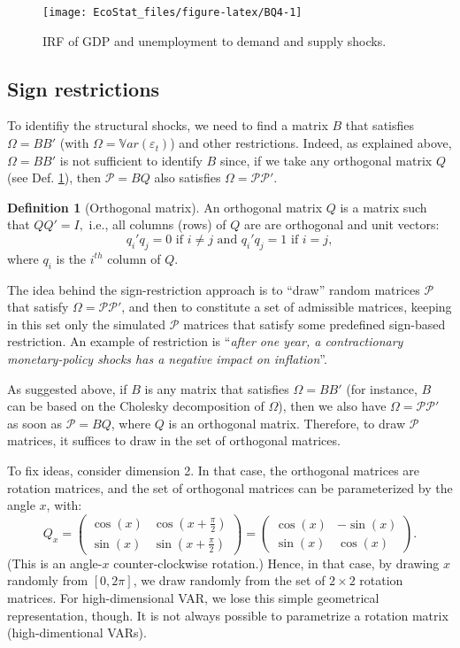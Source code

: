 \documentclass[
  12pt,
]{book}
\theoremstyle{definition}
\newtheorem{definition}{Definition}[chapter]
\theoremstyle{definition}
\theoremstyle{definition}
\theoremstyle{definition}
\theoremstyle{remark}
\begin{document}
\begin{figure}
\texttt{[image: EcoStat\_files/figure-latex/BQ4-1]} \caption{IRF of GDP and unemployment to demand and supply shocks.}\label{fig:BQ4}
\end{figure}

\hypertarget{Signs}{%
\subsection{Sign restrictions}\label{Signs}}

To identifiy the structural shocks, we need to find a matrix \(B\) that satisfies \(\Omega = BB'\) (with \(\Omega = \mathbb{V}ar(\varepsilon_t)\)) and other restrictions. Indeed, as explained above, \(\Omega = BB'\) is not sufficient to identify \(B\) since, if we take any orthogonal matrix \(Q\) (see Def. \ref{def:orthogonal}), then \(\mathcal{P}=BQ\) also satisfies \(\Omega = \mathcal{P}\mathcal{P}'\).

\begin{definition}[Orthogonal matrix]
\protect\hypertarget{def:orthogonal}{}\label{def:orthogonal}An orthogonal matrix \(Q\) is a matrix such that \(QQ' = I,\) i.e., all columns (rows) of \(Q\) are are
orthogonal and unit vectors:
\[q_i'q_j=0\text{ if }i\neq j\text{ and }q_i'q_j=1\text{ if }i= j,\]
where \(q_i\) is the \(i^{th}\) column of \(Q\).
\end{definition}

The idea behind the sign-restriction approach is to ``draw'' random matrices \(\mathcal{P}\) that satisfy \(\Omega = \mathcal{P}\mathcal{P}'\), and then to constitute a set of admissible matrices, keeping in this set only the simulated \(\mathcal{P}\) matrices that satisfy some predefined sign-based restriction. An example of restriction is ``\emph{after one year, a contractionary monetary-policy shocks has a negative impact on inflation}''.

As suggested above, if \(B\) is any matrix that satisfies \(\Omega = BB'\) (for instance, \(B\) can be based on the Cholesky decomposition of \(\Omega\)), then we also have \(\Omega = \mathcal{P}\mathcal{P}'\) as soon as \(\mathcal{P}=BQ\), where \(Q\) is an orthogonal matrix. Therefore, to draw \(\mathcal{P}\) matrices, it suffices to draw in the set of orthogonal matrices.

To fix ideas, consider dimension 2. In that case, the orthogonal matrices are rotation matrices, and the set of orthogonal matrices can be parameterized by the angle \(x\), with:
\[
Q_x=\begin{pmatrix}\cos(x)&\cos\left(x+\frac{\pi}{2}\right)\\
\sin(x)&\sin\left(x+\frac{\pi}{2}\right)\end{pmatrix}=\begin{pmatrix}\cos(x)&-\sin(x)\\
\sin(x)&\cos(x)\end{pmatrix}.
\]
(This is an angle-\(x\) counter-clockwise rotation.) Hence, in that case, by drawing \(x\) randomly from \([0,2\pi]\), we draw randomly from the set of \(2\times2\) rotation matrices. For high-dimensional VAR, we lose this simple geometrical representation, though. It is not always possible to parametrize a rotation matrix (high-dimentional VARs).
\end{document}
